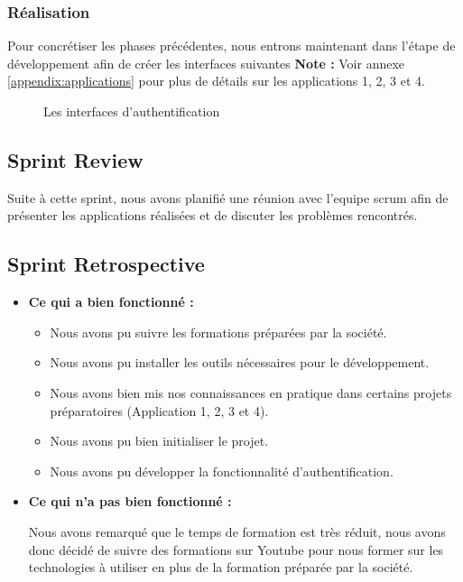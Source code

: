 \subsubsection{Réalisation}

Pour concrétiser les phases précédentes, nous entrons maintenant dans l'étape de développement afin de créer les interfaces suivantes
\textbf{Note :} Voir annexe \ref{appendix:applications} pour plus de détails sur les applications 1, 2, 3 et 4.


\begin{figure}[H]
  \centering
  \caption{Les interfaces d'authentification}
  \label{fig:realision_auth}
\end{figure}


\subsection{Sprint Review}
Suite à cette sprint, nous avons planifié une réunion avec l'equipe scrum afin de présenter les applications réalisées et de discuter les problèmes rencontrés.

\subsection{Sprint Retrospective}

\begin{itemize}
  \item \textbf{Ce qui a bien fonctionné :}
  \begin{itemize}
    \item Nous avons pu suivre les formations préparées par la société.
    \item Nous avons pu installer les outils nécessaires pour le développement.
    \item Nous avons bien mis nos connaissances en pratique dans certains projets préparatoires (Application 1, 2, 3 et 4).
    \item Nous avons pu bien initialiser le projet.
    \item Nous avons pu développer la fonctionnalité d'authentification.
  \end{itemize}
  \item \textbf{Ce qui n'a pas bien fonctionné :}
  
  Nous avons remarqué que le temps de formation est très réduit, nous avons donc décidé de suivre des formations sur Youtube pour nous former sur les technologies à utiliser en plus de la formation préparée par la société.
\end{itemize}

